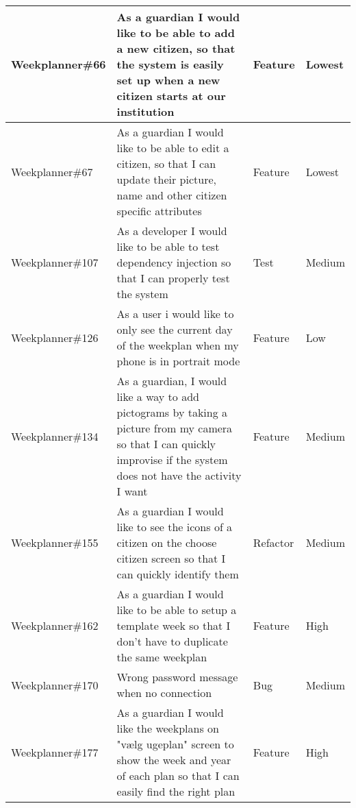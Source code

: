 \begin{longtable}{|p{2.9cm}|p{7cm}|p{1.4cm}|p{1.5cm}|}
    Weekplanner\#66  & As a guardian I would like to be able to add a new citizen, so that the system is easily set up when a new citizen starts at our institution                              & Feature & Lowest \\ \hline
    Weekplanner\#67  & As a guardian I would like to be able to edit a citizen, so that I can update their picture, name and other citizen specific attributes                                   & Feature & Lowest   \\ \hline
    Weekplanner\#107 & As a developer I would like to be able to test dependency injection so that I can properly test the system                                                                & Test & Medium   \\ \hline
    Weekplanner\#126 & As a user i would like to only see the current day of the weekplan when my phone is in portrait mode                                                                      & Feature & Low   \\ \hline
    Weekplanner\#134 & As a guardian, I would like a way to add pictograms by taking a picture from my camera so that I can quickly improvise if the system does not have the activity I want    & Feature & Medium    \\ \hline
    Weekplanner\#155 & As a guardian I would like to see the icons of a citizen on the choose citizen screen so that I can quickly identify them                                                 & Refactor & Medium   \\ \hline
    Weekplanner\#162 & As a guardian I would like to be able to setup a template week so that I don't have to duplicate the same weekplan                                                        & Feature & High  \\ \hline
    Weekplanner\#170 & Wrong password message when no connection                                                                                                                                 & Bug     & Medium \\ \hline
    Weekplanner\#177 & As a guardian I would like the weekplans on "vælg ugeplan" screen to show the week and year of each plan so that I can easily find the right plan                         & Feature & High  \\ \hline

\end{longtable}
